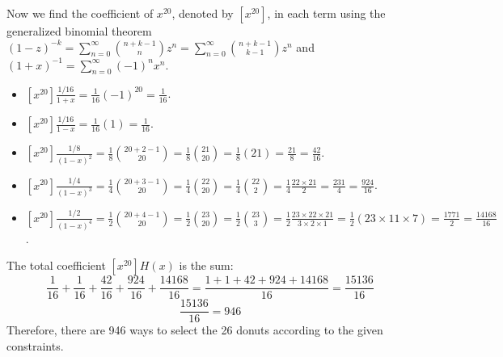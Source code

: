\documentclass{report}
\begin{document}
{	Now we find the coefficient of $x^{20}$, denoted by $[x^{20}]$, in each term using the generalized binomial theorem $(1-z)^{-k} = \sum_{n=0}^\infty \binom{n+k-1}{n} z^n = \sum_{n=0}^\infty \binom{n+k-1}{k-1} z^n$ and $(1+x)^{-1} = \sum_{n=0}^\infty (-1)^n x^n$.
	\begin{itemize}
		\item $[x^{20}] \frac{1/16}{1+x} = \frac{1}{16} (-1)^{20} = \frac{1}{16}$.
		\item $[x^{20}] \frac{1/16}{1-x} = \frac{1}{16} (1) = \frac{1}{16}$.
		\item $[x^{20}] \frac{1/8}{(1-x)^2} = \frac{1}{8} \binom{20+2-1}{20} = \frac{1}{8} \binom{21}{20} = \frac{1}{8} (21) = \frac{21}{8} = \frac{42}{16}$.
		\item $[x^{20}] \frac{1/4}{(1-x)^3} = \frac{1}{4} \binom{20+3-1}{20} = \frac{1}{4} \binom{22}{20} = \frac{1}{4} \binom{22}{2} = \frac{1}{4} \frac{22 \times 21}{2} = \frac{231}{4} = \frac{924}{16}$.
		\item $[x^{20}] \frac{1/2}{(1-x)^4} = \frac{1}{2} \binom{20+4-1}{20} = \frac{1}{2} \binom{23}{20} = \frac{1}{2} \binom{23}{3} = \frac{1}{2} \frac{23 \times 22 \times 21}{3 \times 2 \times 1} = \frac{1}{2} (23 \times 11 \times 7) = \frac{1771}{2} = \frac{14168}{16}$.
	\end{itemize}
	The total coefficient $[x^{20}] H(x)$ is the sum:
	\[ \frac{1}{16} + \frac{1}{16} + \frac{42}{16} + \frac{924}{16} + \frac{14168}{16} = \frac{1+1+42+924+14168}{16} = \frac{15136}{16} \]
	\[ \frac{15136}{16} = 946 \]
	Therefore, there are 946 ways to select the 26 donuts according to the given constraints.
}
\end{document}
